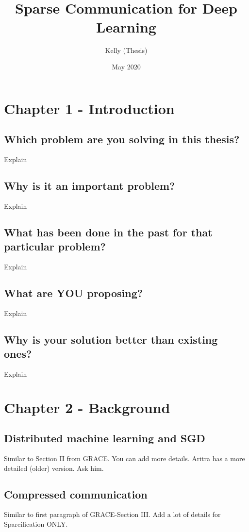 \documentclass{article}
\title{Sparse Communication for Deep Learning}
\author{Kelly (Thesis)}
\date{May 2020}
\begin{document}
\maketitle




\section{Chapter 1 - Introduction}

\subsection{Which problem are you solving in this thesis?}
Explain

\subsection{Why is it an important problem?}
 Explain
 
\subsection{What has been done in the past for that particular problem?}
Explain

\subsection{What are YOU proposing?}
Explain

\subsection{Why is your solution better than existing ones?}
Explain


\section{Chapter 2 - Background}

\subsection{Distributed machine learning and SGD}
Similar to Section II from GRACE. You can add more details. Aritra has a more detailed (older) version. Ask him.  

\subsection{Compressed communication}
Similar to first paragraph of GRACE-Section III. Add a lot of details for Sparcification ONLY.
\end{document}
